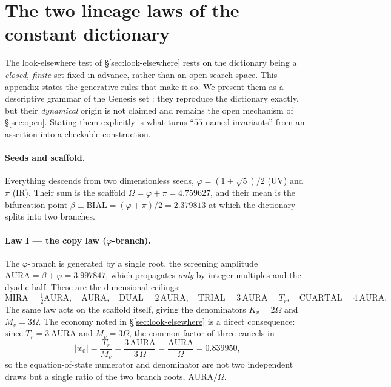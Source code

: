 \documentclass[a4paper,11pt]{article}
\begin{document}
\section{The two lineage laws of the constant dictionary}
\label{app:laws}

The look-elsewhere test of \S\ref{sec:look-elsewhere} rests on the dictionary
being a \emph{closed, finite} set fixed in advance, rather than an open search
space. This appendix states the generative rules that make it so. We present
them as a descriptive grammar of the Genesis set
\citep{AlmeidaSSEE2026genesis}: they reproduce the dictionary exactly, but their
\emph{dynamical} origin is not claimed and remains the open mechanism of
\S\ref{sec:open}. Stating them explicitly is what turns ``$55$ named invariants''
from an assertion into a checkable construction.

\paragraph{Seeds and scaffold.} Everything descends from two dimensionless
seeds, $\varphi=(1+\sqrt5)/2$ (UV) and $\pi$ (IR). Their sum is the scaffold
$\Omega=\varphi+\pi=4.759627$, and their mean is the bifurcation point
$\beta\equiv\mathrm{BIAL}=(\varphi+\pi)/2=2.379813$ at which the dictionary splits
into two branches.

\paragraph{Law I --- the copy law ($\varphi$-branch).} The $\varphi$-branch is
generated by a single root, the screening amplitude
$\mathrm{AURA}=\beta+\varphi=3.997847$, which propagates \emph{only} by integer
multiples and the dyadic half. These are the dimensional ceilings:
\begin{equation}
  \mathrm{MIRA}=\tfrac12\mathrm{AURA},\quad
  \mathrm{AURA},\quad
  \mathrm{DUAL}=2\,\mathrm{AURA},\quad
  \mathrm{TRIAL}=3\,\mathrm{AURA}=T_r,\quad
  \mathrm{CUARTAL}=4\,\mathrm{AURA}.
  \label{eq:copylaw}
\end{equation}
The same law acts on the scaffold itself, giving the denominators
$K_v=2\Omega$ and $M_v=3\Omega$. The economy noted in
\S\ref{sec:look-elsewhere} is a direct consequence: since
$T_r=3\,\mathrm{AURA}$ and $M_v=3\Omega$, the common factor of three cancels in
\begin{equation}
  |w_0|=\frac{T_r}{M_v}=\frac{3\,\mathrm{AURA}}{3\,\Omega}
        =\frac{\mathrm{AURA}}{\Omega}=0.839950 ,
\end{equation}
so the equation-of-state numerator and denominator are not two independent
draws but a single ratio of the two branch roots, $\mathrm{AURA}/\Omega$.
\end{document}

